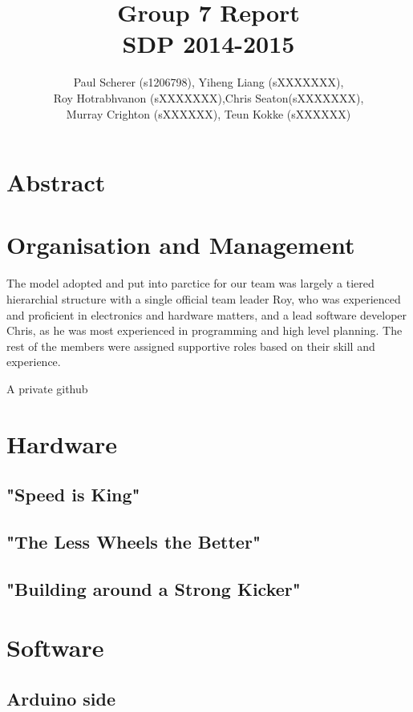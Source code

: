 \documentclass[12pt,a4paper]{article}
\begin{document}
\title{Group 7 Report\\
		SDP 2014-2015}
\author{Paul Scherer (s1206798), Yiheng Liang (sXXXXXXX),\\ Roy Hotrabhvanon (sXXXXXXX),Chris Seaton(sXXXXXXX),\\ Murray Crighton (sXXXXXX), Teun Kokke (sXXXXXX)}
\maketitle

\section{Abstract}

\section{Organisation and Management}
The model adopted and put into parctice for our team was largely a tiered hierarchial structure with a single official team leader Roy, who was experienced and proficient in electronics and hardware matters, and a lead software developer Chris, as he was most experienced in programming and high level planning. The rest of the members were assigned supportive roles based on their skill and experience. 

A private github

\section{Hardware}
\subsection{"Speed is King"}
\subsection{"The Less Wheels the Better"}
\subsection{"Building around a Strong Kicker"}


\section{Software}
\subsection{Arduino side}
\end{document}
